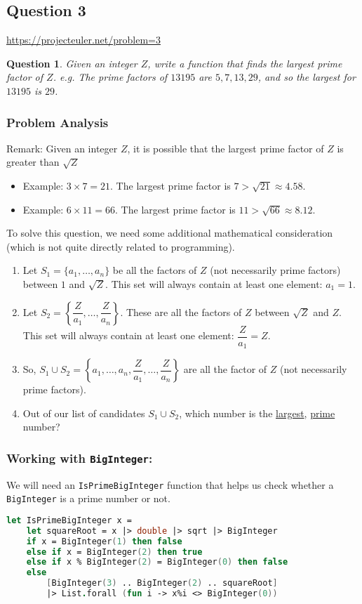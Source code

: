 \documentclass[12pt]{article}
\newtheorem*{question*}{Question}
\begin{document}
\subsection*{Question 3} 
\url{https://projecteuler.net/problem=3}
\begin{question*}
Given an integer $Z$, write a function that finds the largest prime factor of $Z$. e.g. The prime factors of $13195$ are $5, 7, 13, 29$, and so the largest for $13195$ is $29$.
\end{question*}

\subsubsection*{Problem Analysis}
Remark: Given an integer $Z$, it is possible that the largest prime factor of $Z$ is greater than $\sqrt{Z}$
\begin{itemize}
\item Example: $3 \times 7 = 21$. The largest prime factor is $7 > \sqrt{21} \approx 4.58$.

\item Example: $6 \times 11 = 66$. The largest prime factor is $11 > \sqrt{66} \approx 8.12$.
\end{itemize}
To solve this question, we need some additional mathematical consideration (which is not quite directly related to programming).
\begin{enumerate}
\item Let $S_1 = \{a_1, \ldots, a_n\}$ be all the factors of $Z$ (not necessarily prime factors) between $1$ and $\sqrt{Z}$. This set will always contain at least one element: $a_1 = 1$.
\item Let $S_2 = \left\{\dfrac{Z}{a_1},\ldots, \dfrac{Z}{a_n}\right\}$. These are all the factors of $Z$ between $\sqrt{Z}$ and $Z$. This set will always contain at least one element: $\dfrac{Z}{a_1} = Z$.
\item So, $S_1 \cup S_2 =  \left\{a_1, \ldots, a_n, \dfrac{Z}{a_1},\ldots, \dfrac{Z}{a_n}\right\}$ are all the factor of $Z$ (not necessarily prime factors).
\item Out of our list of candidates $S_1 \cup S_2$, which number is the \underline{largest}, \underline{prime} number?
\end{enumerate}
\pagebreak
\subsubsection*{Working with \texttt{BigInteger}:}
We will need an \texttt{IsPrimeBigInteger} function that helps us check whether a \texttt{BigInteger} is a prime number or not.
\begin{lstlisting}[language=FSharp]
let IsPrimeBigInteger x =
    let squareRoot = x |> double |> sqrt |> BigInteger 
    if x = BigInteger(1) then false
    else if x = BigInteger(2) then true
    else if x % BigInteger(2) = BigInteger(0) then false
    else 
        [BigInteger(3) .. BigInteger(2) .. squareRoot]
        |> List.forall (fun i -> x%i <> BigInteger(0))
\end{lstlisting}
\end{document}

